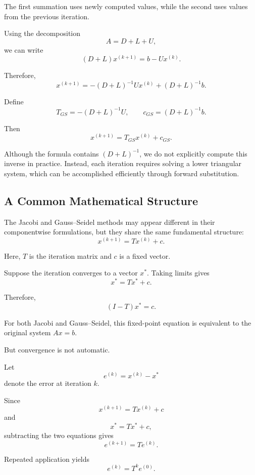 \documentclass[11pt,a4paper]{article}
\theoremstyle{definition}
\theoremstyle{remark}
\begin{document}
The first summation uses newly computed values,
while the second uses values from the previous
iteration.

Using the decomposition
\[
    A=D+L+U,
\]
we can write
\[
    (D+L)x^{(k+1)}
    =
    b-Ux^{(k)}.
\]

Therefore,
\begin{equation}
    \boxed{
    x^{(k+1)}
    =
    -(D+L)^{-1}Ux^{(k)}
    +(D+L)^{-1}b.
    }
    \label{eq:gs_matrix}
\end{equation}

Define
\[
    T_{GS}=-(D+L)^{-1}U,
    \qquad
    c_{GS}=(D+L)^{-1}b.
\]

Then
\begin{equation}
    \boxed{
    x^{(k+1)}
    =
    T_{GS}x^{(k)}+c_{GS}.
    }
    \label{eq:gs_compact}
\end{equation}

Although the formula contains $(D+L)^{-1}$,
we do not explicitly compute this inverse in
practice. Instead, each iteration requires
solving a lower triangular system, which can
be accomplished efficiently through forward
substitution.


\subsection{A Common Mathematical Structure}

The Jacobi and Gauss--Seidel methods may appear
different in their componentwise formulations,
but they share the same fundamental structure:
\[
    \boxed{
    x^{(k+1)}=Tx^{(k)}+c.
    }
\]

Here, $T$ is the iteration matrix and $c$ is
a fixed vector.

Suppose the iteration converges to a vector
$x^*$. Taking limits gives
\[
    x^*=Tx^*+c.
\]

Therefore,
\[
    (I-T)x^*=c.
\]

For both Jacobi and Gauss--Seidel, this fixed-point
equation is equivalent to the original system
$Ax=b$.

But convergence is not automatic.

Let
\[
    e^{(k)}=x^{(k)}-x^*
\]
denote the error at iteration $k$.

Since
\[
    x^{(k+1)}=Tx^{(k)}+c
\]
and
\[
    x^*=Tx^*+c,
\]
subtracting the two equations gives
\[
    e^{(k+1)}=Te^{(k)}.
\]

Repeated application yields
\begin{equation}
    \boxed{
    e^{(k)}=T^ke^{(0)}.
    }
    \label{eq:error_propagation}
\end{equation}
\end{document}
